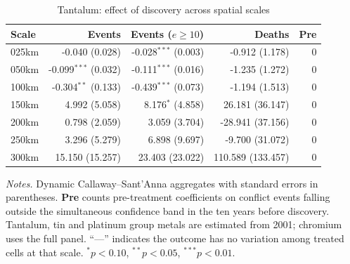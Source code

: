 \begin{table}[H]
\centering
\footnotesize
\caption{Tantalum: effect of discovery across spatial scales}
\label{tab:tantalum_robustness}
\begin{tabular}{lrrrr}
\toprule
\textbf{Scale} & \textbf{Events} & \textbf{Events ($e\geq10$)} & \textbf{Deaths} & \textbf{Pre} \\
\midrule
025km & -0.040 (0.028) & -0.028$^{***}$ (0.003) & -0.912 (1.178) & 0 \\
050km & -0.099$^{***}$ (0.032) & -0.111$^{***}$ (0.016) & -1.235 (1.272) & 0 \\
100km & -0.304$^{**}$ (0.133) & -0.439$^{***}$ (0.073) & -1.194 (1.513) & 0 \\
150km & 4.992 (5.058) & 8.176$^{*}$ (4.858) & 26.181 (36.147) & 0 \\
200km & 0.798 (2.059) & 3.059 (3.704) & -28.941 (37.156) & 0 \\
250km & 3.296 (5.279) & 6.898 (9.697) & -9.700 (31.072) & 0 \\
300km & 15.150 (15.257) & 23.403 (23.022) & 110.589 (133.457) & 0 \\
\bottomrule
\end{tabular}
\begin{minipage}{0.92\textwidth}\vspace{4pt}\scriptsize \textit{Notes.} Dynamic Callaway--Sant'Anna aggregates with standard errors in parentheses. \textbf{Pre} counts pre-treatment coefficients on conflict events falling outside the simultaneous confidence band in the ten years before discovery. Tantalum, tin and platinum group metals are estimated from 2001; chromium uses the full panel. ``---'' indicates the outcome has no variation among treated cells at that scale. $^{*}p<0.10$, $^{**}p<0.05$, $^{***}p<0.01$.\end{minipage}
\end{table}
